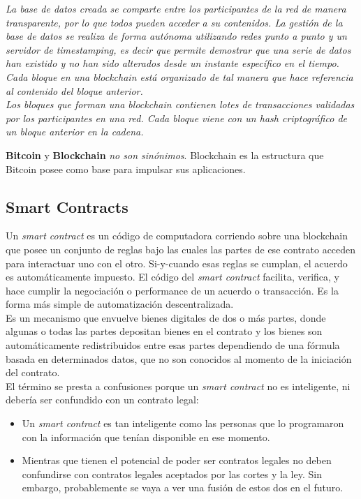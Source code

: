 \textit{La base de datos creada se comparte entre los participantes de la red de manera transparente, por lo que todos pueden acceder a su contenidos. La gestión de la base de datos se realiza de forma autónoma utilizando redes punto a punto y un servidor de timestamping, es decir que permite demostrar que una serie de datos han existido y no han sido alterados desde un instante específico en el tiempo. Cada bloque en una blockchain está organizado de tal manera que hace referencia al contenido del bloque anterior.}\cite{101blockchains}\\

\textit{Los bloques que forman una blockchain contienen lotes de transacciones validadas por los participantes en una red. Cada bloque viene con un hash criptográfico de un bloque anterior en la cadena.}\cite{101blockchains}\\

\begin{notesBox}
    \textbf{Bitcoin} y \textbf{Blockchain} \textit{no son sinónimos}. Blockchain es la estructura que Bitcoin posee como base para impulsar sus aplicaciones.
\end{notesBox}


\subsection{Smart Contracts}
Un \textit{smart contract} es un código de computadora corriendo sobre una blockchain que posee un conjunto de reglas bajo las cuales las partes de ese contrato acceden para interactuar uno con el otro. Si-y-cuando esas reglas se cumplan, el acuerdo es automáticamente impuesto. El código del \textit{smart contract} facilita, verifica, y hace cumplir la negociación o performance de un acuerdo o transacción. Es la forma más simple de automatización descentralizada.\\

Es un mecanismo que envuelve bienes digitales de dos o más partes, donde algunas o todas las partes depositan bienes en el contrato y los bienes son automáticamente redistribuidos entre esas partes dependiendo de una fórmula basada en determinados datos, que no son conocidos al momento de la iniciación del contrato. \\

El término se presta a confusiones porque un \textit{smart contract} no es inteligente, ni debería ser confundido con un contrato legal:
\begin{itemize}
    \item Un \textit{smart contract} es tan inteligente como las personas que lo programaron con la información que tenían disponible en ese momento.
    \item Mientras que tienen el potencial de poder ser contratos legales no deben confundirse con contratos legales aceptados por las cortes y la ley. Sin embargo, probablemente se vaya a ver una fusión de estos dos en el futuro.
\end{itemize}

